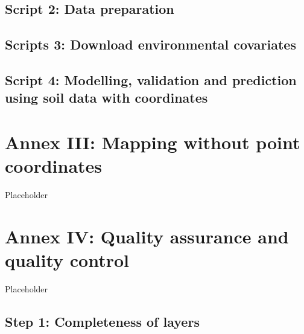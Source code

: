 \documentclass[
  10pt,
  b5paper,
  oneside]{book}
\begin{document}
\hypertarget{script-2-data-preparation}{%
\section*{Script 2: Data preparation}\label{script-2-data-preparation}}

\hypertarget{scripts-3-download-environmental-covariates}{%
\section*{Scripts 3: Download environmental covariates}\label{scripts-3-download-environmental-covariates}}

\hypertarget{script-4-modelling-validation-and-prediction-using-soil-data-with-coordinates}{%
\section*{Script 4: Modelling, validation and prediction using soil data with coordinates}\label{script-4-modelling-validation-and-prediction-using-soil-data-with-coordinates}}

\hypertarget{annex-iii-mapping-without-point-coordinates}{%
\chapter*{Annex III: Mapping without point coordinates}\label{annex-iii-mapping-without-point-coordinates}}

Placeholder

\hypertarget{annex-iv-quality-assurance-and-quality-control}{%
\chapter*{Annex IV: Quality assurance and quality control}\label{annex-iv-quality-assurance-and-quality-control}}

Placeholder

\hypertarget{step-1-completeness-of-layers}{%
\section*{Step 1: Completeness of layers}\label{step-1-completeness-of-layers}}
\end{document}
